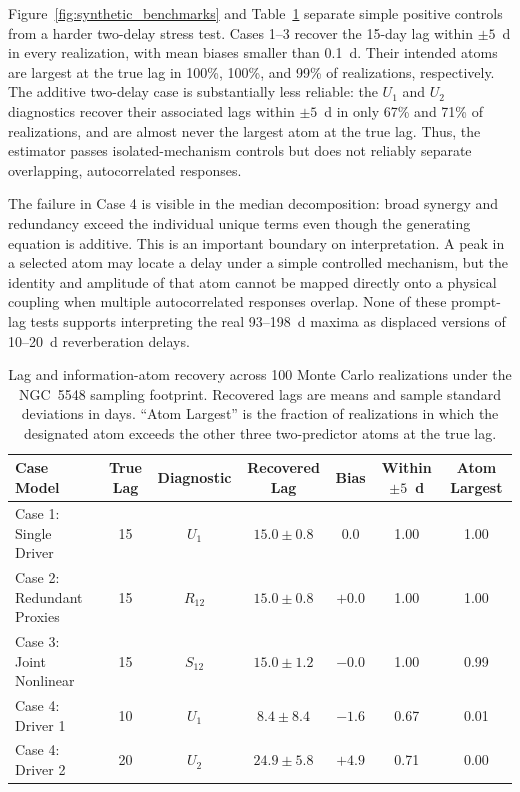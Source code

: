 \documentclass[fleqn,usenatbib]{mnras}
\begin{document}
Figure~\ref{fig:synthetic_benchmarks} and Table~\ref{tab:synthetic_performance} separate simple positive controls from a harder two-delay stress test. Cases 1--3 recover the 15-day lag within $\pm5$~d in every realization, with mean biases smaller than 0.1~d. Their intended atoms are largest at the true lag in 100\%, 100\%, and 99\% of realizations, respectively. The additive two-delay case is substantially less reliable: the $U_1$ and $U_2$ diagnostics recover their associated lags within $\pm5$~d in only 67\% and 71\% of realizations, and are almost never the largest atom at the true lag. Thus, the estimator passes isolated-mechanism controls but does not reliably separate overlapping, autocorrelated responses.

The failure in Case 4 is visible in the median decomposition: broad synergy and redundancy exceed the individual unique terms even though the generating equation is additive. This is an important boundary on interpretation. A peak in a selected atom may locate a delay under a simple controlled mechanism, but the identity and amplitude of that atom cannot be mapped directly onto a physical coupling when multiple autocorrelated responses overlap. None of these prompt-lag tests supports interpreting the real 93--198~d maxima as displaced versions of 10--20~d reverberation delays.

\begin{table}
\centering
\begin{tabular}{lcccccc}
\hline
\textbf{Case Model} & \textbf{True Lag} & \textbf{Diagnostic} & \textbf{Recovered Lag} & \textbf{Bias} & \textbf{Within $\pm5$~d} & \textbf{Atom Largest} \\
\hline
Case 1: Single Driver & 15 & $U_1$ & $15.0 \pm 0.8$ & $0.0$ & 1.00 & 1.00 \\
Case 2: Redundant Proxies & 15 & $R_{12}$ & $15.0 \pm 0.8$ & $+0.0$ & 1.00 & 1.00 \\
Case 3: Joint Nonlinear & 15 & $S_{12}$ & $15.0 \pm 1.2$ & $-0.0$ & 1.00 & 0.99 \\
Case 4: Driver 1 & 10 & $U_1$ & $8.4 \pm 8.4$ & $-1.6$ & 0.67 & 0.01 \\
Case 4: Driver 2 & 20 & $U_2$ & $24.9 \pm 5.8$ & $+4.9$ & 0.71 & 0.00 \\
\hline
\end{tabular}
\caption{Lag and information-atom recovery across 100 Monte Carlo realizations under the NGC~5548 sampling footprint. Recovered lags are means and sample standard deviations in days. ``Atom Largest'' is the fraction of realizations in which the designated atom exceeds the other three two-predictor atoms at the true lag.}
\label{tab:synthetic_performance}
\end{table}
\end{document}
